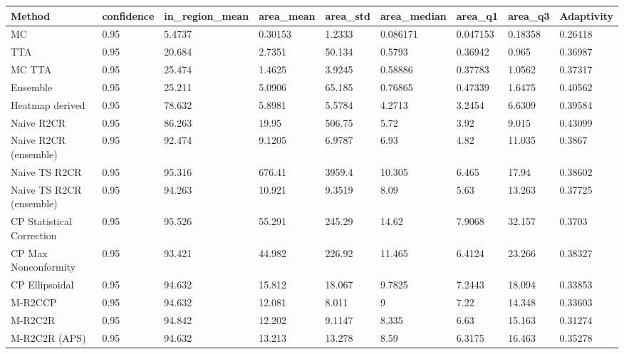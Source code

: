 \begin{tabular}{lllllllll}
\toprule
Method & confidence & in_region_mean & area_mean & area_std & area_median & area_q1 & area_q3 & Adaptivity \\
\midrule
MC & 0.95 & 5.4737 & 0.30153 & 1.2333 & 0.086171 & 0.047153 & 0.18358 & 0.26418 \\
TTA & 0.95 & 20.684 & 2.7351 & 50.134 & 0.5793 & 0.36942 & 0.965 & 0.36987 \\
MC TTA & 0.95 & 25.474 & 1.4625 & 3.9245 & 0.58886 & 0.37783 & 1.0562 & 0.37317 \\
Ensemble & 0.95 & 25.211 & 5.0906 & 65.185 & 0.76865 & 0.47339 & 1.6475 & 0.40562 \\
Heatmap derived & 0.95 & 78.632 & 5.8981 & 5.5784 & 4.2713 & 3.2454 & 6.6309 & 0.39584 \\
Naive R2CR & 0.95 & 86.263 & 19.95 & 506.75 & 5.72 & 3.92 & 9.015 & 0.43099 \\
Naive R2CR (ensemble) & 0.95 & 92.474 & 9.1205 & 6.9787 & 6.93 & 4.82 & 11.035 & 0.3867 \\
Naive TS R2CR & 0.95 & 95.316 & 676.41 & 3959.4 & 10.305 & 6.465 & 17.94 & 0.38602 \\
Naive TS R2CR (ensemble) & 0.95 & 94.263 & 10.921 & 9.3519 & 8.09 & 5.63 & 13.263 & 0.37725 \\
CP Statistical Correction & 0.95 & 95.526 & 55.291 & 245.29 & 14.62 & 7.9068 & 32.157 & 0.3703 \\
CP Max Nonconformity & 0.95 & 93.421 & 44.982 & 226.92 & 11.465 & 6.4124 & 23.266 & 0.38327 \\
CP Ellipsoidal & 0.95 & 94.632 & 15.812 & 18.067 & 9.7825 & 7.2443 & 18.094 & 0.33853 \\
M-R2CCP & 0.95 & 94.632 & 12.081 & 8.011 & 9 & 7.22 & 14.348 & 0.33603 \\
M-R2C2R & 0.95 & 94.842 & 12.202 & 9.1147 & 8.335 & 6.63 & 15.163 & 0.31274 \\
M-R2C2R (APS) & 0.95 & 94.632 & 13.213 & 13.278 & 8.59 & 6.3175 & 16.463 & 0.35278 \\
\bottomrule
\end{tabular}
